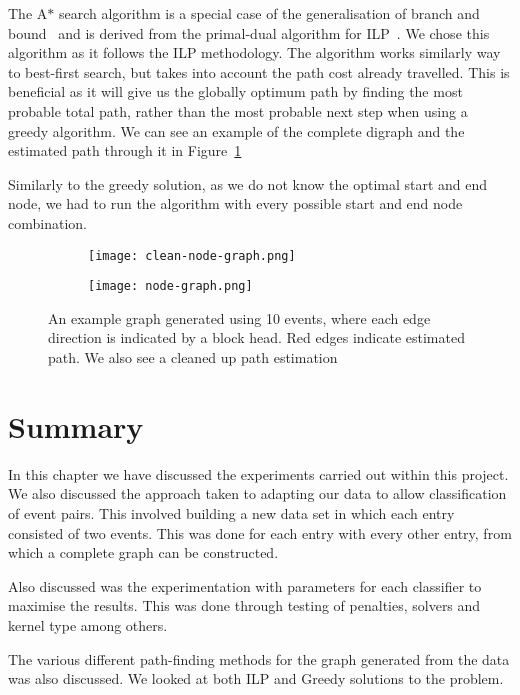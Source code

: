 \documentclass[bsc,frontabs,twoside,singlespacing,parskip,deptreport]{infthesis}     %
\begin{document}
The A$*$ search algorithm is a special case of the generalisation of branch and bound~\cite{balas1983branch} and is derived from the primal-dual algorithm for ILP~\cite{ye2012note}.
We chose this algorithm as it follows the ILP methodology. The algorithm works similarly way to best-first search, but takes into account the path cost already travelled.
This is beneficial as it will give us the globally optimum path by finding the most probable total path, rather than the most probable next step when using a
greedy algorithm. We can see an example of the complete digraph and the estimated path through it in Figure~\ref{figure:minigraph}

Similarly to the greedy solution, as we do not know the optimal start and end node, we had to run the algorithm with every possible start and end node combination.
\begin{figure}
\centering
\begin{subfigure}{.5\textwidth}
  \centering
  \texttt{[image: clean-node-graph.png]}
\end{subfigure}%
\begin{subfigure}
  \centering
  \texttt{[image: node-graph.png]}
\end{subfigure}
\caption{An example graph generated using 10 events, where each edge direction is indicated by a block head. Red edges indicate estimated path. We also see a cleaned up path estimation }
\label{figure:minigraph}
\end{figure}

\section{Summary}
In this chapter we have discussed the experiments carried out within this project.
We also discussed the approach taken to adapting our data to allow classification of event pairs. This involved building a new data set
in which each entry consisted of two events. This was done for each entry with every other entry, from which a complete
graph can be constructed.

Also discussed was the experimentation with parameters for each classifier to maximise the results. This was done through
testing of penalties, solvers and kernel type among others.

The various different path-finding methods for the graph generated from the data was also discussed.
We looked at both ILP and Greedy solutions to the problem.
\end{document}
